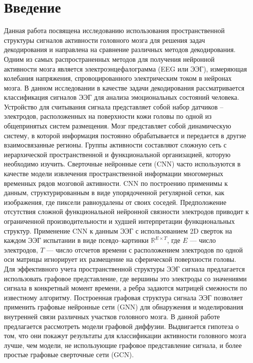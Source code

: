 \documentclass{article}
\begin{document}
\section{Введение}
Данная работа посвящена исследованию использования пространственной структуры сигналов активности головного мозга для решения задач декодирования и направлена на сравнение различных методов декодирования. Одним из самых распространенных методов для получения нейронной активности мозга является электроэнцефалограмма (EEG или ЭЭГ), измеряющая колебания
напряжения, спровоцированного электрическим током в нейронах мозга. В данном исследовании в качестве задачи декодирования рассматривается классификация сигналов ЭЭГ для анализа эмоциональных состояний человека. Устройство для считывания сигнала представляет собой
набор датчиков – электродов, расположенных на поверхности кожи головы по одной
из общепринятых систем размещения. Мозг представляет собой динамическую систему, в которой информация постоянно обрабатывается и передается в другие взаимосвязанные регионы. Группы
активности составляют сложную сеть с иерархической пространственной и функциональной организацией, которую необходимо изучить. Сверточные нейронные
сети (CNN) часто используются в качестве модели извлечения пространственной информации многомерных временных рядов мозговой активности. CNN по построению применимы к
данным, структурированным в виде упорядоченной регулярной сетки, как изображения, где пиксели равноудалены от своих соседей. Предположение отсутствия сложной
функциональной нейронной связности электродов приводит к ограниченной производительности и худшей интерпретации функциональных структур. Применение CNN
к данным ЭЭГ с использованием 2D сверток на каждом ЭЭГ испытании в виде псевдо–картинки $\mathbb{R}^{E\times T}$, где $E$ — число
электродов, $T$ — число отсчетов времени с расположением электродов по одной оси матрицы игнорирует их размещение на сферической поверхности головы. Для эффективного учета пространственной структуры ЭЭГ сигнала предлагается использовать графовое представление, где вершины это электроды со значениями
сигнала в конкретный момент времени, а ребра задаются матрицей смежности по известному алгоритму. Построенная графовая структура сигнала ЭЭГ позволяет применить графовые
нейронные сети (GNN) для обнаружения и моделирования внутренней связи
различных участков головного мозга. В данной работе предлагается рассмотреть модели графовой диффузии. Выдвигается гипотеза о том, что они покажут результаты для классификации активности головного мозга лучше, чем модели, не использующие графовое представление сигнала, и более простые графовые сверточные сети (GCN).

\end{document}
